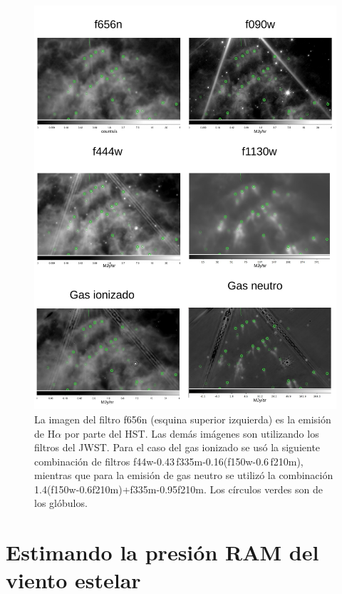 \documentclass{book}
\begin{document}
\begin{figure}[htb]
    \centering
    \includegraphics[width=\textwidth]{imagenes_corregidas/Arreglo_04.pdf}
    \caption{La imagen del filtro f656n (esquina superior izquierda)
      es la emisión de H$\alpha$ por parte del HST. Las demás imágenes son
      utilizando los filtros del JWST. Para el caso del gas ionizado
      se usó la siguiente combinación de filtros
      f44w-0.43\,f335m-0.16(f150w-0.6\,f210m), mientras que para la
      emisión de gas neutro se utilizó la combinación
      1.4(f150w-0.6\;f210m)+f335m-0.95\;f210m. Los círculos verdes son
      de los glóbulos.}
    \label{fig:filters WR124}
\end{figure}

\section{Estimando la presión RAM del viento estelar}
\end{document}
